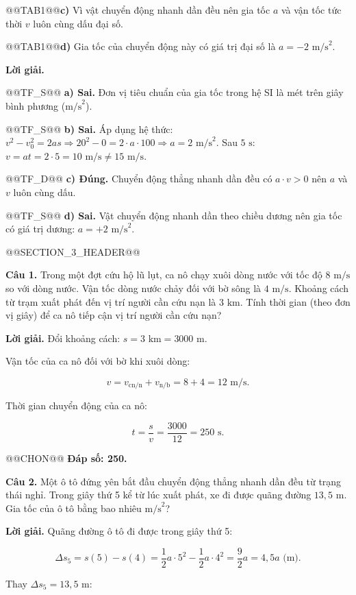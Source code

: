 \documentclass{article}
\begin{document}
@@TAB1@@\textbf{c)} Vì vật chuyển động nhanh dần đều nên gia tốc $a$ và vận tốc tức thời $v$ luôn cùng dấu đại số.

@@TAB1@@\textbf{d)} Gia tốc của chuyển động này có giá trị đại số là $a = -2\text{ m/s}^2$.

\textbf{Lời giải.}

@@TF_S@@ \textbf{a) Sai.} Đơn vị tiêu chuẩn của gia tốc trong hệ SI là mét trên giây bình phương ($\text{m/s}^2$).

@@TF_S@@ \textbf{b) Sai.} Áp dụng hệ thức: $v^2 - v_0^2 = 2as \Rightarrow 20^2 - 0 = 2 \cdot a \cdot 100 \Rightarrow a = 2\text{ m/s}^2$. Sau $5\text{ s}$: $v = at = 2 \cdot 5 = 10\text{ m/s} \ne 15\text{ m/s}$.

@@TF_D@@ \textbf{c) Đúng.} Chuyển động thẳng nhanh dần đều có $a \cdot v > 0$ nên $a$ và $v$ luôn cùng dấu.

@@TF_S@@ \textbf{d) Sai.} Vật chuyển động nhanh dần theo chiều dương nên gia tốc có giá trị dương: $a = +2\text{ m/s}^2$.

@@SECTION_3_HEADER@@

\textbf{Câu 1.} Trong một đợt cứu hộ lũ lụt, ca nô chạy xuôi dòng nước với tốc độ $8\text{ m/s}$ so với dòng nước. Vận tốc dòng nước chảy đối với bờ sông là $4\text{ m/s}$. Khoảng cách từ trạm xuất phát đến vị trí người cần cứu nạn là $3\text{ km}$. Tính thời gian (theo đơn vị giây) để ca nô tiếp cận vị trí người cần cứu nạn?

\textbf{Lời giải.} Đổi khoảng cách: $s = 3\text{ km} = 3000\text{ m}$.

Vận tốc của ca nô đối với bờ khi xuôi dòng:

\[v = v_{\text{cn/n}} + v_{\text{n/b}} = 8 + 4 = 12\text{ m/s}.\]

Thời gian chuyển động của ca nô:

\[t = \frac{s}{v} = \frac{3000}{12} = 250\text{ s}.\]

@@CHON@@ \textbf{Đáp số: 250.}

\textbf{Câu 2.} Một ô tô đứng yên bắt đầu chuyển động thẳng nhanh dần đều từ trạng thái nghỉ. Trong giây thứ 5 kể từ lúc xuất phát, xe đi được quãng đường $13{,}5\text{ m}$. Gia tốc của ô tô bằng bao nhiêu $\text{m/s}^2$?

\textbf{Lời giải.} Quãng đường ô tô đi được trong giây thứ 5:

\[\Delta s_5 = s(5) - s(4) = \frac{1}{2}a \cdot 5^2 - \frac{1}{2}a \cdot 4^2 = \frac{9}{2}a = 4{,}5a\text{ (m)}.\]

Thay $\Delta s_5 = 13{,}5\text{ m}$:
\end{document}
